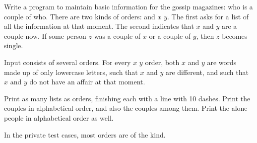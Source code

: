 

\Statement

Write a program to maintain basic information
for the gossip magazines: who is a couple of who.
There are two kinds of orders:  and  $x$ $y$.
The first asks for a list of all the information at that moment.
The second indicates that $x$ and $y$ are a couple now.
If some person $z$ was a couple of $x$ or a couple of $y$,
then $z$ becomes single.


\Input

Input consists of several orders.
For every  $x$ $y$ order,
both $x$ and $y$ are words made up of only lowercase letters,
such that $x$ and $y$ are different,
and such that $x$ and $y$ do not have an affair at that moment.


\Output

Print as many lists as  orders,
finishing each with a line with 10 dashes.
Print the couples in alphabetical order, and also the couples among them.
Print the alone people in alphabetical order as well.


\Observation

In the private test cases,
most orders are of the  kind.


\clearpage

\Sample
